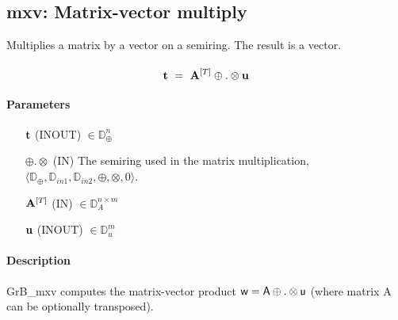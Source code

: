 

\subsection{{\sf mxv}: Matrix-vector multiply}

Multiplies a matrix by a vector on a semiring. The result is a vector.

\paragraph{\syntax}

$$
{\bf t}~ = ~ {\bf A}^{[T]} \oplus.\otimes {\bf u}
$$

\paragraph{Parameters}

\begin{itemize}[leftmargin=1.1in]
    \item[${\bf t}$]    ({\sf INOUT}) $\in \mathbb{D}_\oplus^{n}$

    \item[$\oplus.\otimes$]   ({\sf IN}) The semiring used in the matrix
    multiplication, $\langle \mathbb{D}_\oplus, \mathbb{D}_{in1},\mathbb{D}_{in2},\oplus,\otimes,0 \rangle$.

    \item[${\bf A}^{[T]}$]    ({\sf IN}) $\in \mathbb{D}_A^{n\times m}$

    \item[${\bf u}$]    ({\sf INOUT}) $\in \mathbb{D}_{u}^{m}$

\end{itemize}

\paragraph{Description}

{\sf GrB\_mxv} computes the matrix-vector product ${\sf w} = {\sf A}
\oplus . \otimes {\sf u}$ (where matrix {\sf A}
 can be optionally transposed).



